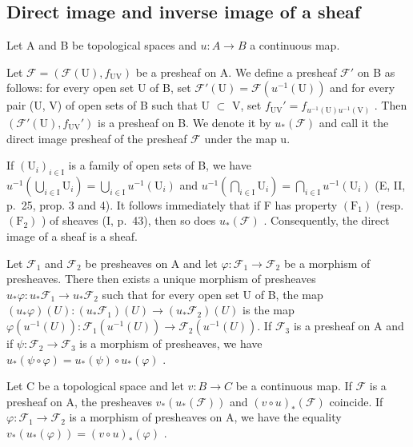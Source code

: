 \subsection{Direct image and inverse image of a sheaf}

Let A and B be topological spaces and \(u: A \rightarrow B\) a continuous map.

Let \(\mathcal{F} = (\mathcal{F}(\mathrm{U}), f_{\mathrm{UV}})\) be a presheaf on A. We define a presheaf \(\mathcal{F}'\) on B as follows: for every open set U of B, set \(\mathcal{F}'(\mathrm{U}) = \mathcal{F}(u^{-1}(\mathrm{U}))\) and for every pair (U, V) of open sets of B such that U \(\subset\) V, set \(f_{\mathrm{UV}}' = f_{u^{-1}(\mathrm{U})u^{-1}(\mathrm{V})}\) . Then \((\mathcal{F}'(\mathrm{U}), f_{\mathrm{UV}}')\) is a presheaf on B. We denote it by \(u_{*}(\mathcal{F})\) and call it the direct image presheaf of the presheaf \(\mathcal{F}\) under the map u.

If \((\mathrm{U}_{i})_{i\in\mathrm{I}}\) is a family of open sets of B, we have \(u^{-1}(\bigcup_{i\in\mathrm{I}}\mathrm{U}_{i})=\bigcup_{i\in\mathrm{I}}u^{-1}(\mathrm{U}_{i})\) and \(u^{-1}(\bigcap_{i\in\mathrm{I}}\mathrm{U}_{i})=\bigcap_{i\in\mathrm{I}}u^{-1}(\mathrm{U}_{i})\) (E, II, p.~25, prop. 3 and 4). It follows immediately that if F has property \((\mathrm{F}_{1})\) (resp. \((\mathrm{F}_{2})\) ) of sheaves (I, p.~43), then so does \(u_{*}(\mathcal{F})\) . Consequently, the direct image of a sheaf is a sheaf.

Let \(\mathcal{F}_1\) and \(\mathcal{F}_2\) be presheaves on A and let \(\varphi\colon\mathcal{F}_1\to\mathcal{F}_2\) be a morphism of presheaves. There then exists a unique morphism of presheaves \(u_*\varphi\colon u_*\mathcal{F}_1\to u_*\mathcal{F}_2\) such that for every open set U of B, the map \((u_*\varphi)(U)\colon(u_*\mathcal{F}_1)(U)\to(u_*\mathcal{F}_2)(U)\) is the map \(\varphi(u^{-1}(U))\colon\mathcal{F}_{1}(u^{-1}(U))\to\mathcal{F}_{2}(u^{-1}(U)).\) If \(\mathcal{F}_{3}\) is a presheaf on A and if \(\psi\colon\mathcal{F}_{2}\to\mathcal{F}_{3}\) is a morphism of presheaves, we have \(u_{*}(\psi\circ\varphi)=u_{*}(\psi)\circ u_{*}(\varphi)\) .

Let C be a topological space and let \(v: B \to C\) be a continuous map. If \(\mathcal{F}\) is a presheaf on A, the presheaves \(v_{*}(u_{*}(\mathcal{F}))\) and \((v \circ u)_{*}(\mathcal{F})\) coincide. If \(\varphi: \mathcal{F}_{1} \to \mathcal{F}_{2}\) is a morphism of presheaves on A, we have the equality \(v_{*}(u_{*}(\varphi)) = (v \circ u)_{*}(\varphi)\) .

